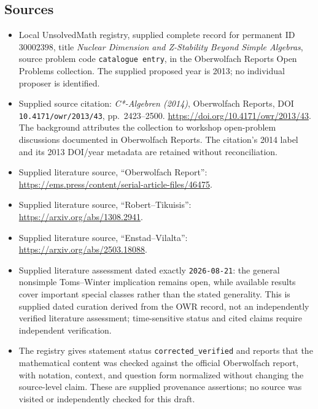 \documentclass[11pt]{article}
\begin{document}
\subsection{Sources}
\begin{itemize}
\item Local UnsolvedMath registry, supplied complete record for permanent ID \(30002398\), title \emph{Nuclear Dimension and Z-Stability Beyond Simple Algebras}, source problem code \texttt{catalogue entry}, in the Oberwolfach Reports Open Problems collection. The supplied proposed year is 2013; no individual proposer is identified.
\item Supplied source citation: \emph{C*-Algebren (2014)}, Oberwolfach Reports, DOI \texttt{10.4171/owr/2013/43}, pp.\ 2423--2500. \url{https://doi.org/10.4171/owr/2013/43}. The background attributes the collection to workshop open-problem discussions documented in Oberwolfach Reports. The citation's 2014 label and its 2013 DOI/year metadata are retained without reconciliation.
\item Supplied literature source, ``Oberwolfach Report'': \url{https://ems.press/content/serial-article-files/46475}.
\item Supplied literature source, ``Robert--Tikuisis'': \url{https://arxiv.org/abs/1308.2941}.
\item Supplied literature source, ``Enstad--Vilalta'': \url{https://arxiv.org/abs/2503.18088}.
\item Supplied literature assessment dated exactly \texttt{2026-08-21}: the general nonsimple Toms--Winter implication remains open, while available results cover important special classes rather than the stated generality. This is supplied dated curation derived from the OWR record, not an independently verified literature assessment; time-sensitive status and cited claims require independent verification.
\item The registry gives statement status \texttt{corrected\_verified} and reports that the mathematical content was checked against the official Oberwolfach report, with notation, context, and question form normalized without changing the source-level claim. These are supplied provenance assertions; no source was visited or independently checked for this draft.
\end{itemize}
\end{document}
